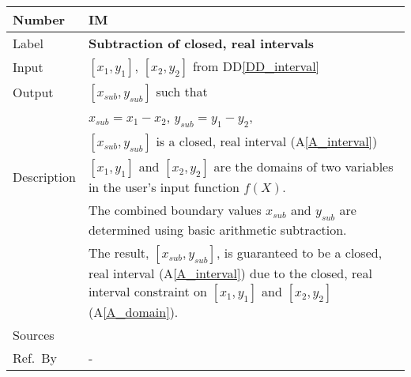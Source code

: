 \documentclass[12pt]{article}
\newcommand{\colAwidth}{0.13\textwidth}
\newcommand{\colBwidth}{0.82\textwidth}
\newcommand{\ddref}[1]{DD\ref{#1}}
\newcommand{\aref}[1]{A\ref{#1}}
\newcounter{instnum} %
\begin{document}
~\newline

\noindent
\begin{minipage}{\textwidth}
	\renewcommand*{\arraystretch}{1.5}
	\begin{tabular}{| p{\colAwidth} | p{\colBwidth}|}
		\hline
		\rowcolor[gray]{0.9}
		Number& IM{instnum}\theinstnum \label{I_subtraction}\\
		\hline
		Label& \bf Subtraction of closed, real intervals\\
		\hline
		Input&$[x_{1}, y_{1}]$, $[x_{2}, y_{2}]$ from \ddref{DD_interval}\\
		\hline
		Output&$[x_{sub}, y_{sub}]$ such that\\
		&$x_{sub} = x_{1} - x_{2}$, $y_{sub} = y_{1} - y_{2}$,\\
		&$[x_{sub}, y_{sub}]$ is a closed, real interval (\aref{A_interval}) \\
		\hline
		Description&$[x_{1}, y_{1}]$ and $[x_{2}, y_{2}]$ are the domains of 
		two variables in the user's input function $f(X)$. \\
		&The combined boundary values $x_{sub}$ and  $y_{sub}$ are determined 
		using basic arithmetic subtraction.\\
		& The result, $[x_{sub}, y_{sub}]$, is guaranteed to be a closed, real 
		interval (\aref{A_interval}) due to the closed, real interval 
		constraint on $[x_{1}, y_{1}]$ and $[x_{2}, y_{2}]$ (\aref{A_domain}).
		\\
		\hline
		Sources& ~\cite{intervalarithmetic} \ \\
		\hline
		Ref.\ By & -\\
		\hline
	\end{tabular}
\end{minipage}\\

~\newline
\end{document}
